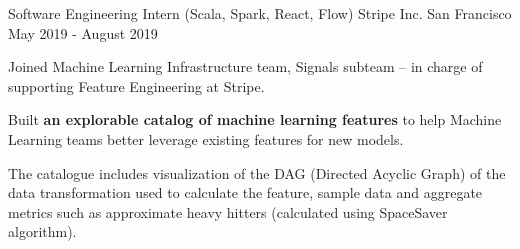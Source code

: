 

\begin{cventries}


  \cventry
  {Software Engineering Intern (Scala, Spark, React, Flow)} %
  {Stripe Inc.} %
  {San Francisco} %
  {May 2019 - August 2019} %
  {
    \begin{cvitems}
      \item {Joined Machine Learning Infrastructure team, Signals subteam -- in charge of supporting Feature Engineering at Stripe.}
      \item {Built \textbf{an explorable catalog of machine learning features} to help Machine Learning teams better leverage existing features for new models.}
      \item {The catalogue includes visualization of the DAG (Directed Acyclic Graph) of the data transformation used to calculate the feature, sample data and aggregate metrics such as approximate heavy hitters (calculated using SpaceSaver algorithm).}
    \end{cvitems}
  }


\end{cventries}
